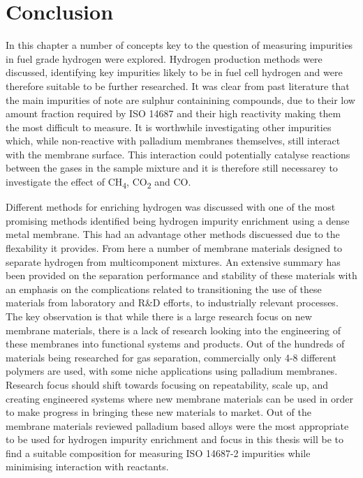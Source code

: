     \eject \pdfpagewidth=8.3in \pdfpageheight=11.7in


\section{Conclusion}
In this chapter a number of concepts key to the question of measuring impurities in fuel grade hydrogen were explored. Hydrogen production methods were discussed, identifying key impurities likely to be in fuel cell hydrogen and were therefore suitable to be further researched. It was clear from past literature that the main impurities of note are sulphur containining compounds, due to their low amount fraction required by ISO 14687 and their high reactivity making them the most difficult to measure. It is worthwhile investigating other impurities which, while non-reactive with palladium membranes themselves, still interact with the membrane surface. This interaction could potentially catalyse reactions between the gases in the sample mixture and it is therefore still necessarey to investigate the effect of CH\textsubscript{4}, CO\textsubscript{2} and CO.

Different methods for enriching hydrogen was discussed with one of the most promising methods identified being hydrogen impurity enrichment using a dense metal membrane. This had an advantage other methods discuessed due to the flexability it provides. From here a number of membrane materials designed to separate hydrogen from multicomponent mixtures. An extensive summary has been provided on the separation performance and stability of these materials with an emphasis on the complications related to transitioning the use of these materials from laboratory and  R\&D efforts, to industrially relevant processes. The key observation is that while there is a large research focus on new membrane materials, there is a lack of research looking into the engineering of these membranes into functional systems and products. Out of the hundreds of materials being researched for gas separation, commercially only 4-8 different polymers are used, with some niche applications using palladium membranes. Research focus should shift towards focusing on repeatability, scale up, and creating engineered systems where new membrane materials can be used in order to make progress in bringing these new materials to market. Out of the membrane materials reviewed palladium based alloys were the most appropriate to be used for hydrogen impurity enrichment and focus in this thesis will be to find a suitable composition for measuring ISO 14687-2 impurities while minimising interaction with reactants. 

